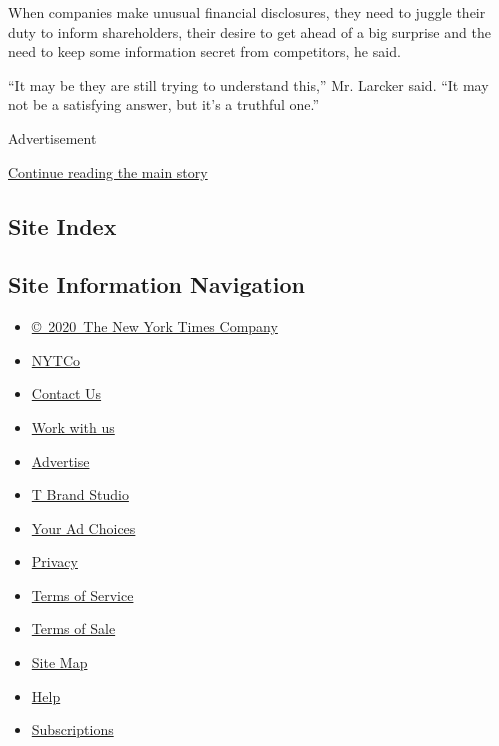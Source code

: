 When companies make unusual financial disclosures, they need to juggle
their duty to inform shareholders, their desire to get ahead of a big
surprise and the need to keep some information secret from competitors,
he said.

``It may be they are still trying to understand this,'' Mr. Larcker
said. ``It may not be a satisfying answer, but it's a truthful one.''

Advertisement

\protect\hyperlink{after-bottom}{Continue reading the main story}

\hypertarget{site-index}{%
\subsection{Site Index}\label{site-index}}

\hypertarget{site-information-navigation}{%
\subsection{Site Information
Navigation}\label{site-information-navigation}}

\begin{itemize}
\tightlist
\item
  \href{https://help.nytimes.com/hc/en-us/articles/115014792127-Copyright-notice}{©~2020~The
  New York Times Company}
\end{itemize}

\begin{itemize}
\tightlist
\item
  \href{https://www.nytco.com/}{NYTCo}
\item
  \href{https://help.nytimes.com/hc/en-us/articles/115015385887-Contact-Us}{Contact
  Us}
\item
  \href{https://www.nytco.com/careers/}{Work with us}
\item
  \href{https://nytmediakit.com/}{Advertise}
\item
  \href{http://www.tbrandstudio.com/}{T Brand Studio}
\item
  \href{https://www.nytimes.com/privacy/cookie-policy\#how-do-i-manage-trackers}{Your
  Ad Choices}
\item
  \href{https://www.nytimes.com/privacy}{Privacy}
\item
  \href{https://help.nytimes.com/hc/en-us/articles/115014893428-Terms-of-service}{Terms
  of Service}
\item
  \href{https://help.nytimes.com/hc/en-us/articles/115014893968-Terms-of-sale}{Terms
  of Sale}
\item
  \href{https://spiderbites.nytimes.com}{Site Map}
\item
  \href{https://help.nytimes.com/hc/en-us}{Help}
\item
  \href{https://www.nytimes.com/subscription?campaignId=37WXW}{Subscriptions}
\end{itemize}

